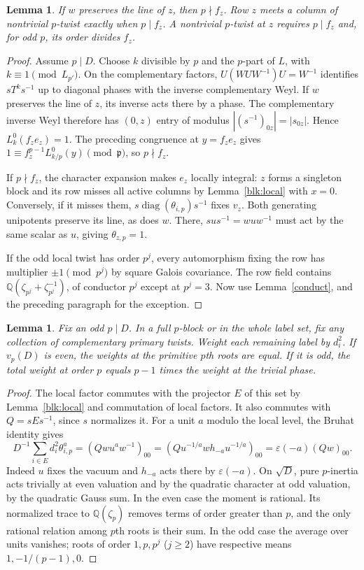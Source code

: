 \documentclass[11pt]{amsart}
\numberwithin{equation}{section}
\newtheorem{lemma}[theorem]{Lemma}
\newcommand{\QQ}{\mathbb Q}
\begin{document}
\begin{lemma}\label{blk:admissible}
If $w$ preserves the line of $z$, then $p\nmid f_z$. Row $z$ meets a
column of nontrivial $p$-twist exactly when $p\mid f_z$. A nontrivial
$p$-twist at $z$ requires $p\mid f_z$ and, for odd $p$, its order divides $f_z$.
\end{lemma}
\begin{proof}
Assume $p\mid D$. Choose $k$ divisible by $p$ and the $p$-part of $L$,
with $k\equiv1\pmod{L_{p'}}$. On the complementary factors,
$U(WUW^{-1})U=W^{-1}$ identifies $sT^ks^{-1}$ up to diagonal phases
with the inverse complementary Weyl. If $w$ preserves the line of $z$,
its inverse acts there by a phase. The complementary inverse Weyl
therefore has $(0,z)$ entry of modulus $|(s^{-1})_{0z}|=|s_{0z}|$.
Hence $L_k^0(f_ze_z)=1$. The preceding congruence at $y=f_ze_z$ gives
$1\equiv f_z^{p-1}L_{k/p}^0(y)\pmod{\mathfrak p}$, so $p\nmid f_z$.

If $p\nmid f_z$, the character expansion makes $e_z$ locally integral:
$z$ forms a singleton block and its row misses all active columns by
Lemma~\ref{blk:local} with $x=0$. Conversely, if it misses them,
$s\operatorname{diag}(\theta_{i,p})s^{-1}$ fixes $v_z$. Both generating
unipotents preserve its line, as does $w$. There, $sus^{-1}=wuw^{-1}$
must act by the same scalar as $u$, giving $\theta_{z,p}=1$.

If the odd local twist has order $p^j$, every automorphism fixing the row
has multiplier $\pm1\pmod{p^j}$ by square Galois covariance. The row
field contains $\QQ(\zeta_{p^j}+\zeta_{p^j}^{-1})$, of conductor $p^j$
except at $p^j=3$. Now use Lemma~\ref{conduct}, and the preceding
paragraph for the exception.
\end{proof}

\begin{lemma}\label{blk:moments}
Fix an odd $p\mid D$. In a full $p$-block or in the whole label set, fix
any collection of complementary primary twists. Weight each remaining
label by $d_i^2$. If $v_p(D)$ is even, the weights at the primitive
$p$th roots are equal. If it is odd, the total weight at order $p$ equals
$p-1$ times the weight at the trivial phase.
\end{lemma}
\begin{proof}
The local factor commutes with the projector $E$ of this set by
Lemma~\ref{blk:local} and commutation of local factors. It also commutes
with $Q=sEs^{-1}$, since $s$ normalizes it. For a unit $a$ modulo the
local level, the Bruhat identity gives
\[
 D^{-1}\sum_{i\in E}d_i^2\theta_{i,p}^a
 =(Qwu^aw^{-1})_{00}=(Qu^{-1/a}wh_{-a}u^{-1/a})_{00}
 =\varepsilon(-a)(Qw)_{00}.
\]
Indeed $u$ fixes the vacuum and $h_{-a}$ acts there by
$\varepsilon(-a)$. On $\sqrt D$, pure $p$-inertia acts trivially at even
valuation and by the quadratic character at odd valuation, by the
quadratic Gauss sum. In the even case the moment is rational. Its
normalized trace to $\QQ(\zeta_p)$ removes terms of order greater than
$p$, and the only rational relation among $p$th roots is their sum.
In the odd case the average over units vanishes; roots of order $1,p,p^j$
($j\ge2$) have respective means $1,-1/(p-1),0$.
\end{proof}
\end{document}
